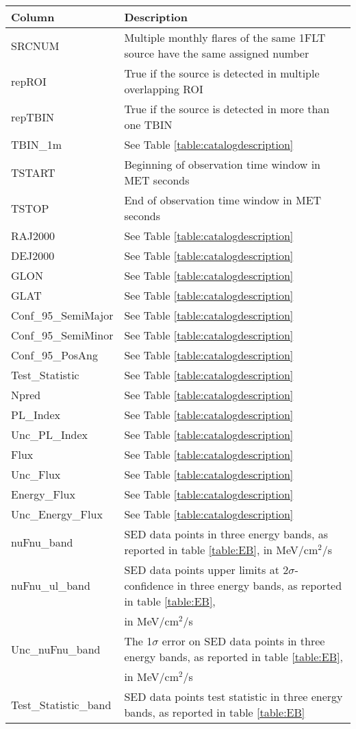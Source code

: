 \begin{tabular}{ll} 
\hline
\hline
  \multicolumn{1}{l}{Column}&
  \multicolumn{1}{l}{Description}\\
\hline
  SRCNUM & Multiple monthly flares of the same 1FLT source have the same assigned number\\
  repROI & True if the source is detected in multiple overlapping ROI\\
  repTBIN &  True if the source is detected in more than one TBIN\\
  TBIN\_1m & See Table \ref{table:catalogdescription}\\
  TSTART & Beginning of observation time window in MET seconds\\
  TSTOP & End of observation time window in MET seconds\\
  RAJ2000  & See Table \ref{table:catalogdescription}\\
  DEJ2000 & See Table \ref{table:catalogdescription}\\
  GLON & See Table \ref{table:catalogdescription}\\
  GLAT & See Table \ref{table:catalogdescription}\\
  Conf\_95\_SemiMajor & See Table \ref{table:catalogdescription}\\
  Conf\_95\_SemiMinor & See Table \ref{table:catalogdescription}\\
  Conf\_95\_PosAng & See Table \ref{table:catalogdescription}\\ 
  Test\_Statistic & See Table \ref{table:catalogdescription}\\
  Npred & See Table \ref{table:catalogdescription}\\
  PL\_Index & See Table \ref{table:catalogdescription}\\
  Unc\_PL\_Index &  See Table \ref{table:catalogdescription}\\
  Flux &  See Table \ref{table:catalogdescription}\\
  Unc\_Flux &  See Table \ref{table:catalogdescription}\\
  Energy\_Flux & See Table \ref{table:catalogdescription}\\ 
  Unc\_Energy\_Flux &  See Table \ref{table:catalogdescription}\\
  nuFnu\_band &  SED data points in three energy bands, as reported in table \ref{table:EB}, in MeV/cm$^2$/s\\
  nuFnu\_ul\_band & SED data points upper limits at 2$\sigma$-confidence in three energy bands, as reported in table \ref{table:EB},\\
   &in MeV/cm$^2$/s\\
  Unc\_nuFnu\_band &  The 1$\sigma$ error on SED data points in three energy bands, as reported in table \ref{table:EB},\\
   & in MeV/cm$^2$/s\\
  Test\_Statistic\_band &  SED data points test statistic in three energy bands, as reported in table \ref{table:EB}\\
\hline
\end{tabular}


